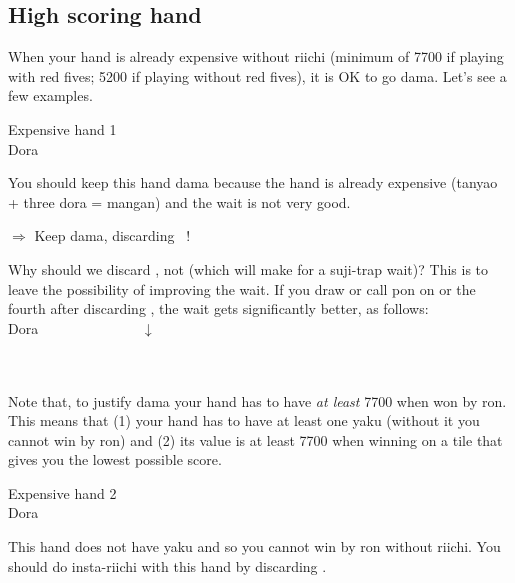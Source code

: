 \subsection{High scoring hand} \label{sec:high}
When your hand is already expensive without riichi (minimum of 7700 if playing with red fives; 5200 if playing without red fives), it is OK to go {\jap dama}. Let's see a few examples.

\bigskip
\begin{itembox}[r]{Expensive hand 1}
\bp
{}~~\\
\hfill\footnotesize{{\jap Dora}~~~~~~~}
\ep
\vspace{-15pt}
\end{itembox}
\noindent You should keep this hand {\jap dama} because the hand is already expensive ({\jap tanyao} + three {\jap dora} = {\jap mangan}) and the wait is not very good.
\begin{center}
{\Large $\Rightarrow$ Keep {\jap dama}, discarding  ~!}
\end{center}
Why should we discard {\LARGE{}}, not {\LARGE{}} (which will make for a {\jap suji}-trap wait)? 
This is to leave the possibility of improving the wait. If you draw or call {\jap pon} on {\LARGE{}} or the fourth {\LARGE{}} after discarding {\LARGE{}}, the wait gets significantly better, as follows:
\bp
{}~~\\
\hfill\footnotesize{{\jap Dora}~~~~~~~~~~~~~~}
\ep
\bp
\vspace{-40pt}
$\downarrow$\\
 \\
\\
\ep

\bigskip
Note that, to justify {\jap dama} your hand has to have \emph{at least} 7700 when won by {\jap ron}. This means that (1) your hand has to have at least one {\jap yaku} (without it you cannot win by {\jap ron}) and (2) its value is at least 7700 when winning on a tile that gives you the lowest possible score.

\bigskip
\begin{itembox}[r]{Expensive hand 2}
\bp
{}~~\\
\hfill\footnotesize{{\jap Dora}~~~~~~~}
\ep
\vspace{-15pt}
\end{itembox}
\noindent
This hand does not have {\jap yaku} and so you cannot win by {\jap ron} without riichi. You should do insta-riichi with this hand by discarding {\LARGE{}}.

